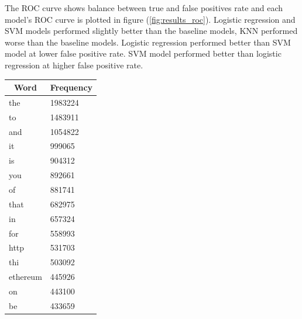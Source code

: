 \documentclass[transmag]{IEEEtran}
\begin{document}
\noindent The ROC curve shows balance between true and false positives rate and each model's ROC curve is plotted in figure (\ref{fig:results_roc}). Logistic regression and SVM models performed slightly better than the baseline models, KNN performed worse than the baseline models. Logistic regression performed better than SVM model at lower false positive rate. SVM model performed better than logistic regression at higher false positive rate.

\begin{table}[h]
\begin{center}
\begin{tabular}{|l|l|}
\hline
\multicolumn{1}{|c|}{\textbf{Word}} & \multicolumn{1}{c|}{\textbf{Frequency}} \\ \hline
the                                 & 1983224                                 \\ \hline
to                                  & 1483911                                 \\ \hline
and                                 & 1054822                                 \\ \hline
it                                  & 999065                                  \\ \hline
is                                  & 904312                                  \\ \hline
you                                 & 892661                                  \\ \hline
of                                  & 881741                                  \\ \hline
that                                & 682975                                  \\ \hline
in                                  & 657324                                  \\ \hline
for                                 & 558993                                  \\ \hline
http                                & 531703                                  \\ \hline
thi                                 & 503092                                  \\ \hline
ethereum                            & 445926                                  \\ \hline
on                                  & 443100                                  \\ \hline
be                                  & 433659                                  \\ \hline

\end{tabular}
\end{center}
\end{table}
\end{document}
